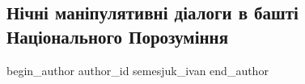  
 
 
 
 
 
\subsection{Нічні маніпулятивні діалоги в башті Національного Порозуміння}
\label{sec:26_11_2020.fb.semesjuk_ivan.1.rich_kosmopolyta_2020}
\ifcmt
	begin_author
   author_id semesjuk_ivan
	end_author
\fi

